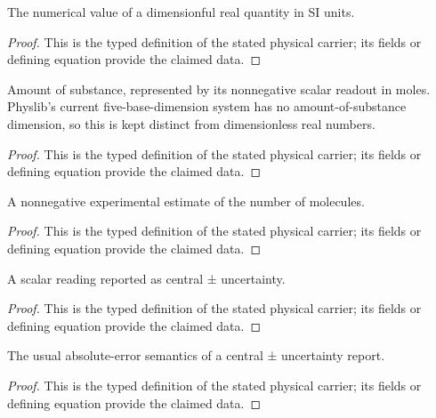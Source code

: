 \begin{definition}
  \label{def:physics:IPhO_2026_4_A_1:aux006}
  The numerical value of a dimensionful real quantity in SI units.
\end{definition}
\begin{proof}
  This is the typed definition of the stated physical carrier; its fields or defining equation provide the claimed data.
\end{proof}

\begin{definition}
  \label{def:physics:IPhO_2026_4_A_1:aux007}
  Amount of substance, represented by its nonnegative scalar readout in moles. Physlib's current five-base-dimension system has no amount-of-substance dimension, so this is kept distinct from dimensionless real numbers.
\end{definition}
\begin{proof}
  This is the typed definition of the stated physical carrier; its fields or defining equation provide the claimed data.
\end{proof}

\begin{definition}
  \label{def:physics:IPhO_2026_4_A_1:aux008}
  A nonnegative experimental estimate of the number of molecules.
\end{definition}
\begin{proof}
  This is the typed definition of the stated physical carrier; its fields or defining equation provide the claimed data.
\end{proof}

\begin{definition}
  \label{def:physics:IPhO_2026_4_A_1:aux009}
  A scalar reading reported as central ± uncertainty.
\end{definition}
\begin{proof}
  This is the typed definition of the stated physical carrier; its fields or defining equation provide the claimed data.
\end{proof}

\begin{definition}
  \label{def:physics:IPhO_2026_4_A_1:aux010}
  The usual absolute-error semantics of a central ± uncertainty report.
\end{definition}
\begin{proof}
  This is the typed definition of the stated physical carrier; its fields or defining equation provide the claimed data.
\end{proof}

